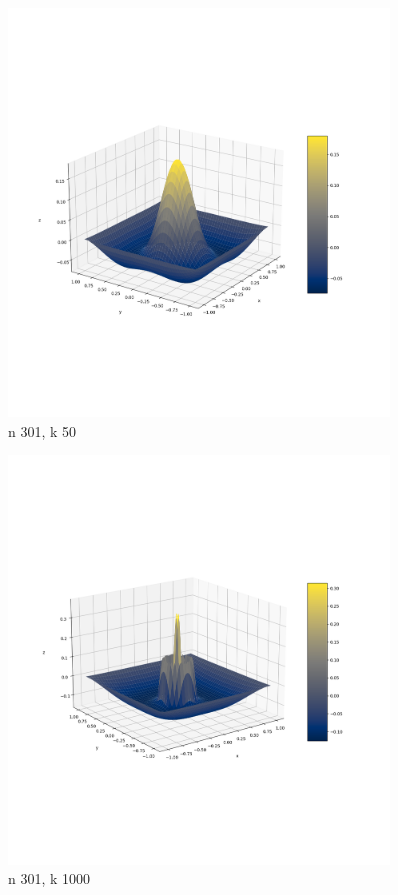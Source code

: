 \documentclass{article}
\begin{document}
    \begin{figure}[h]
        \centering
        \includegraphics[width=0.9\textwidth]{nal1_n301_k50.png}
        \caption{n 301, k 50}
    \end{figure}

    \begin{figure}[h]
        \centering
        \includegraphics[width=0.9\textwidth]{nal1_n301_k1000.png}
        \caption{n 301, k 1000}
    \end{figure}
\end{document}
